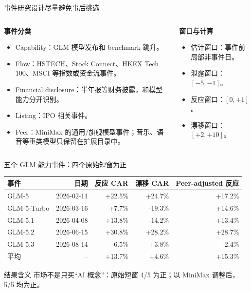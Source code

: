 \documentclass[aspectratio=169,11pt]{beamer}
\newcommand{\smallnote}[1]{\vspace{0.2em}{\footnotesize #1}}
\begin{document}
\begin{frame}{事件研究设计尽量避免事后挑选}
  \begin{columns}[T,onlytextwidth]
    \begin{column}{0.48\textwidth}
      \textbf{事件分类}
      \begin{itemize}
        \item Capability：GLM 模型发布和 benchmark 跳升。
        \item Flow：HSTECH、Stock Connect、HKEX Tech 100、MSCI 等指数或资金流事件。
        \item Financial disclosure：半年报等财务披露，和模型能力分开识别。
        \item Listing：IPO 相关事件。
        \item Peer：MiniMax 的通用/旗舰模型事件；音乐、语音等垂类模型只保留在扩展目录中。
      \end{itemize}
    \end{column}
    \begin{column}{0.48\textwidth}
      \textbf{窗口与计算}
      \begin{itemize}
        \item 估计窗口：事件前局部非事件日。
        \item 泄露窗口：$[-5,-1]$。
        \item 反应窗口：$[0,+1]$。
        \item 漂移窗口：$[+2,+10]$。
      \end{itemize}
    \end{column}
  \end{columns}
  \smallnote{完整窗口样本含 16 个发行方自身可交易的 large-tech 发布；OpenAI/xAI 的股票代理、半年报及 8 月下旬不完整窗口只留目录，不强算 CAR。}
\end{frame}

\begin{frame}{五个 GLM 能力事件：四个原始短窗为正}
  \begin{table}
    \centering
    \small
    \begin{tabular}{lrrrr}
      \toprule
      事件 & 日期 & 反应 CAR & 漂移 CAR & Peer-adjusted 反应 \\
      \midrule
      GLM-5 & 2026-02-11 & +22.5\% & +24.7\% & +17.2\% \\
      GLM-5-Turbo & 2026-03-16 & +7.7\% & -19.3\% & +14.6\% \\
      GLM-5.1 & 2026-04-08 & +13.8\% & -14.2\% & +13.4\% \\
      GLM-5.2 & 2026-06-15 & +30.8\% & +28.2\% & +28.7\% \\
      GLM-5.3 & 2026-08-14 & -6.5\% & +3.8\% & +2.4\% \\
      \midrule
      平均 & -- & +13.7\% & +4.6\% & +15.3\% \\
      \bottomrule
    \end{tabular}
  \end{table}
  \begin{block}{结果含义}
    市场不是只买“AI 概念”：原始短窗 4/5 为正；以 MiniMax 调整后，5/5 均为正。
  \end{block}
\end{frame}
\end{document}
